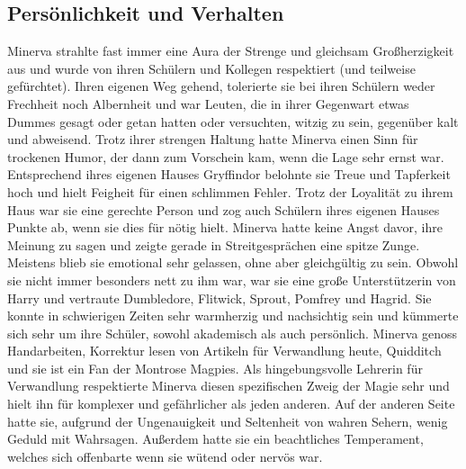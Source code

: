 \documentclass[a4paper, 10pt]{article}
\begin{document}
\subsection*{\Large Persönlichkeit und Verhalten}
Minerva strahlte fast immer eine Aura der Strenge und gleichsam Großherzigkeit aus und wurde von ihren Schülern und Kollegen respektiert (und teilweise gefürchtet). Ihren eigenen Weg gehend, tolerierte sie bei ihren Schülern weder Frechheit noch Albernheit und war Leuten, die in ihrer Gegenwart etwas Dummes gesagt oder getan hatten oder versuchten, witzig zu sein, gegenüber kalt und abweisend. Trotz ihrer strengen Haltung hatte Minerva einen Sinn für trockenen Humor, der dann zum Vorschein kam, wenn die Lage sehr ernst war.
\vspace{10pt}
\newline
Entsprechend ihres eigenen Hauses Gryffindor belohnte sie Treue und Tapferkeit hoch und hielt Feigheit für einen schlimmen Fehler. Trotz der Loyalität zu ihrem Haus war sie eine gerechte Person und zog auch Schülern ihres eigenen Hauses Punkte ab, wenn sie dies für nötig hielt.
\vspace{10pt}
\newline
Minerva hatte keine Angst davor, ihre Meinung zu sagen und zeigte gerade in Streitgesprächen eine spitze Zunge. Meistens blieb sie emotional sehr gelassen, ohne aber gleichgültig zu sein. Obwohl sie nicht immer besonders nett zu ihm war, war sie eine große Unterstützerin von Harry und vertraute Dumbledore, Flitwick, Sprout, Pomfrey und Hagrid. Sie konnte in schwierigen Zeiten sehr warmherzig und nachsichtig sein und kümmerte sich sehr um ihre Schüler, sowohl akademisch als auch persönlich.
\vspace{10pt}
\newline
Minerva genoss Handarbeiten, Korrektur lesen von Artikeln für Verwandlung heute, Quidditch und sie ist ein Fan der Montrose Magpies.
\vspace{10pt}
\newline
Als hingebungsvolle Lehrerin für Verwandlung respektierte Minerva diesen spezifischen Zweig der Magie sehr und hielt ihn für komplexer und gefährlicher als jeden anderen. Auf der anderen Seite hatte sie, aufgrund der Ungenauigkeit und Seltenheit von wahren Sehern, wenig Geduld mit Wahrsagen.
\vspace{10pt}
\newline
Außerdem hatte sie ein beachtliches Temperament, welches sich offenbarte wenn sie wütend oder nervös war.
\end{document}
